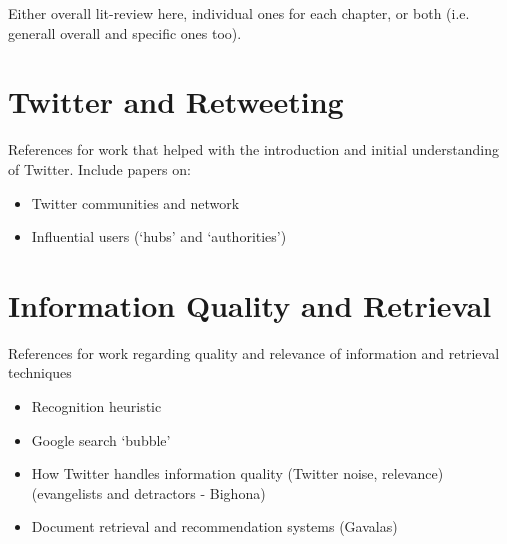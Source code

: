 Either overall lit-review here, individual ones for each chapter, or both (i.e. generall overall and specific ones too).

\section{Twitter and Retweeting}
References for work that helped with the introduction and initial understanding of Twitter. Include papers on:
\begin{itemize}
\item Twitter communities and network
\item Influential users (`hubs' and `authorities')
\end{itemize}

\section{Information Quality and Retrieval}
References for work regarding quality and relevance of information and retrieval techniques
\begin{itemize}
\item Recognition heuristic
\item Google search `bubble'
\item How Twitter handles information quality (Twitter noise, relevance) (evangelists and detractors - Bighona)
\item Document retrieval and recommendation systems (Gavalas)
\end{itemize}

